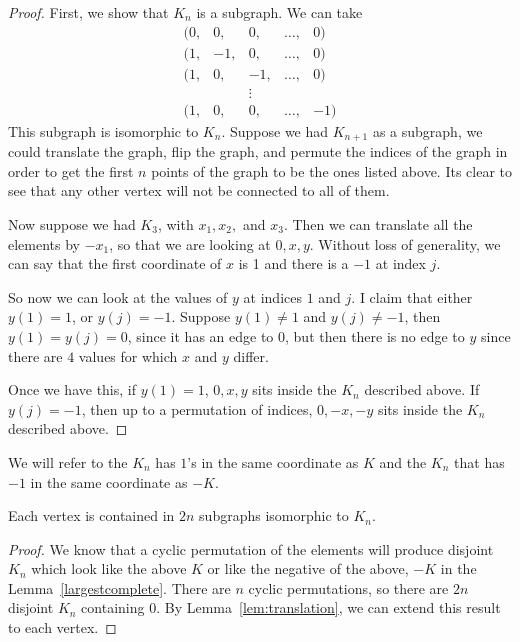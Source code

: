 \documentclass[runningheads,a4paper]{llncs}
\begin{document}
\begin{proof}
First, we show that $K_n$ is a subgraph. We can take 
\[ \begin{array}{ccccc} (0, &0, &0, &\dots, &0) \\
			     (1, &-1, &0, &\dots, &0) \\
			     (1, &0, &-1, &\dots, &0) \\
				&&\vdots \\
			     (1, &0, &0, &\dots, &-1) \end{array} \]
This subgraph is isomorphic to $K_n$. Suppose we had $K_{n+1}$ as a subgraph, we could translate the graph, flip the graph, and permute the indices of the graph in order to get the first $n$ points of the graph to be the ones listed above. Its clear to see that any other vertex will not be connected to all of them.

Now suppose we had $K_3$, with $x_1, x_2,$ and $x_3$. Then we can translate all the elements by $-x_1$, so that we are looking at $0, x, y$. Without loss of generality, we can say that the first coordinate of $x$ is 1 and there is a $-1$ at index $j$. 

So now we can look at the values of $y$ at indices $1$ and $j$. I claim that either $y(1) = 1$, or $y(j) = -1$. Suppose $y(1) \neq 1$ and $y(j) \neq -1$, then $y(1) = y(j) = 0$, since it has an edge to $0$, but then there is no edge to $y$ since there are $4$ values for which $x$ and $y$ differ. 

Once we have this, if $y(1) = 1$, $0,x, y$ sits inside the $K_n$ described above. If $y(j) = -1$, then up to a permutation of indices, $0, -x, -y$ sits inside the $K_n$ described above.
\end{proof}

We will refer to the $K_n$ has $1$'s in the same coordinate as $K$ and the $K_n$ that has $-1$ in the same coordinate as $-K$. 

\begin{lemma}
Each vertex is contained in $2n$ subgraphs isomorphic to $K_n$. 
\end{lemma}

\begin{proof}
We know that a cyclic permutation of the elements will produce disjoint $K_n$ which look like the above $K$ or like the negative of the above,  $-K$ in the Lemma~\ref{largestcomplete}. There are $n$ cyclic permutations, so there are $2n$ disjoint $K_n$ containing $0$. By Lemma~\ref{lem:translation}, we can extend this result to each vertex.
\end{proof}
\end{document}
